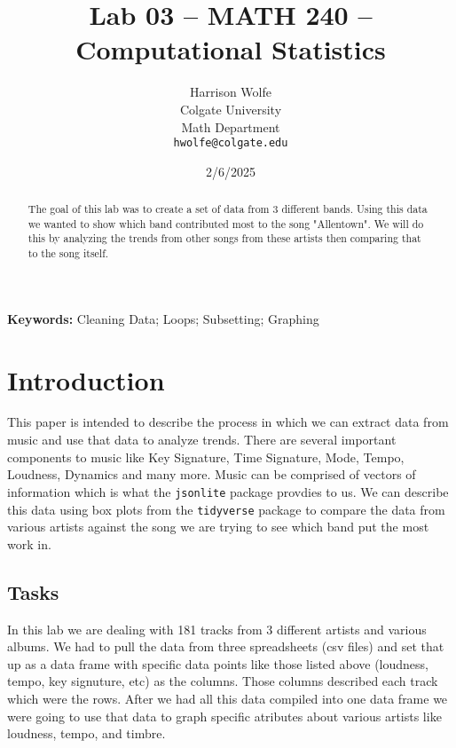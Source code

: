 \documentclass{article}\usepackage[]{graphicx}\usepackage[]{xcolor}
\begin{document}
\vspace{-1in}
\title{Lab 03 -- MATH 240 -- Computational Statistics}

\author{
  Harrison Wolfe \\
  Colgate University  \\
  Math Department \\
  {\tt hwolfe@colgate.edu}
}

\date{2/6/2025}

\maketitle

\begin{multicols}{2}
\begin{abstract}

The goal of this lab was to create a set of data from 3 different bands. Using this data we wanted to show which band contributed most to the song "Allentown". We will do this by analyzing the trends from other songs from these artists then comparing that to the song itself. 
\end{abstract}

\noindent \textbf{Keywords:} Cleaning Data; Loops; Subsetting; Graphing

\section{Introduction}

This paper is intended to describe the process in which we can extract data from music and use that data to analyze trends. There are several important components to music like Key Signature, Time Signature, Mode, Tempo, Loudness, Dynamics and many more. Music can be comprised of vectors of information which is what the \texttt{jsonlite} package provdies to us. \citep{jsonlite} We can describe this data using box plots from the \texttt{tidyverse} package to compare the data from various artists against the song we are trying to see which band put the most work in. \citep{tidyverse}
\subsection{Tasks}
In this lab we are dealing with 181 tracks from 3 different artists and various albums. We had to pull the data from three spreadsheets (csv files) and set that up as a data frame with specific data points like those listed above (loudness, tempo, key signuture, etc) as the columns. Those columns described each track which were the rows. After we had all this data compiled into one data frame we were going to use that data to graph specific atributes about various artists like loudness, tempo, and timbre. 




\end{multicols}
\end{document}
